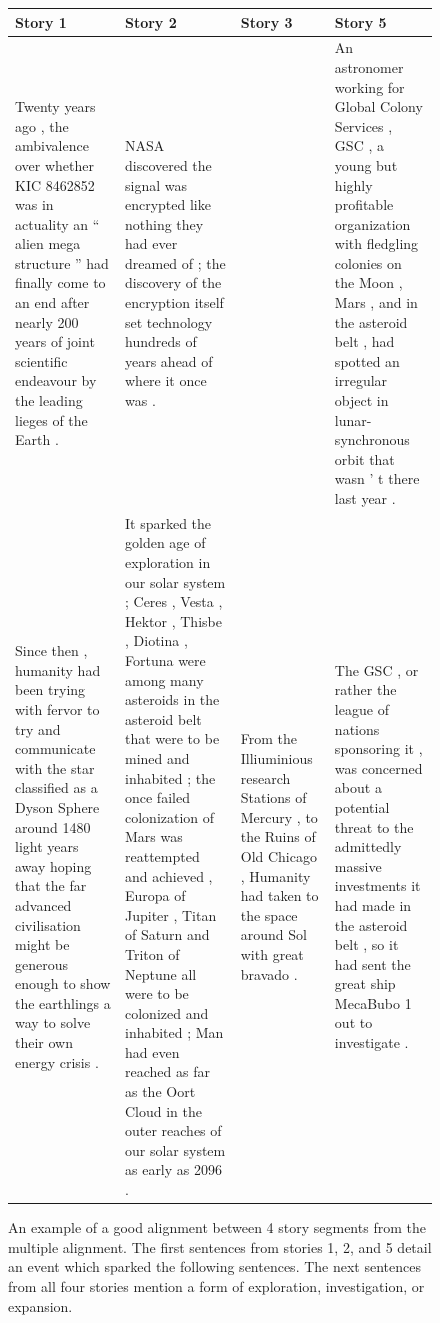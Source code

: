 \documentclass{article}
\begin{document}
\begin{figure}[h]
\centering
\small
\begin{tabular}{|p{}|p{}|p{}|p{}|}
\hline
\textbf{Story 1} & \textbf{Story 2} & \textbf{Story 3} & \textbf{Story 5}
\\
\hline
 Twenty years ago , the ambivalence over whether KIC 8462852 was in actuality an `` alien mega structure '' had finally come to an end after nearly 200 years of joint scientific endeavour by the leading lieges of the Earth .
& NASA discovered the signal was encrypted like nothing they had ever dreamed of ; the discovery of the encryption itself set technology hundreds of years ahead of where it once was .
&& An astronomer working for Global Colony Services , GSC , a young but highly profitable organization with fledgling colonies on the Moon , Mars , and in the asteroid belt , had spotted an irregular object in lunar-synchronous orbit that wasn ’ t there last year .
\\
\hline
Since then , humanity had been trying with fervor to try and communicate with the star classified as a Dyson Sphere around 1480 light years away hoping that the far advanced civilisation might be generous enough to show the earthlings a way to solve their own energy crisis .
& It sparked the golden age of exploration in our solar system ; Ceres , Vesta , Hektor , Thisbe , Diotina , Fortuna were among many asteroids in the asteroid belt that were to be mined and inhabited ; the once failed colonization of Mars was reattempted and achieved , Europa of Jupiter , Titan of Saturn and Triton of Neptune all were to be colonized and inhabited ; Man had even reached as far as the Oort Cloud in the outer reaches of our solar system as early as 2096 .
& From the Illiuminious research Stations of Mercury , to the Ruins of Old Chicago , Humanity had taken to the space around Sol with great bravado .
& The GSC , or rather the league of nations sponsoring it , was concerned about a potential threat to the admittedly massive investments it had made in the asteroid belt , so it had sent the great ship MecaBubo 1 out to investigate .
\\
\hline
\end{tabular}
\caption{
\label{fig:good-alignment}
An example of a good alignment between 4 story segments from the multiple alignment.
The first sentences from stories 1, 2, and 5 detail an event which sparked the following sentences.
The next sentences from all four stories mention a form of exploration, investigation, or expansion.
}
\end{figure}
\end{document}
